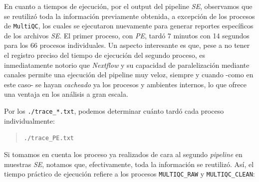 \documentclass[
  letterpaper,
  DIV=11,
  numbers=noendperiod]{scrartcl}
\begin{document}
En cuanto a tiempos de ejecución, por el output del pipeline \emph{SE},
observamos que se reutilizó toda la información previamente obtenida, a
excepción de los procesos de \texttt{MultiQC}, los cuales se ejecutaron
nuevamente para generar reportes específicos de los archivos \emph{SE}.
El primer proceso, con \emph{PE}, tardó 7 minutos con 14 segundos para
los 66 procesos individuales. Un aspecto interesante es que, pese a no
tener el registro preciso del tiempo de ejecución del segundo proceso,
es inmediatamente notorio que \emph{Nextflow} y su capacidad de
paralelización mediante canales permite una ejecución del pipeline muy
veloz, siempre y cuando -como en este caso- se hayan \emph{cacheado} ya
los procesos y ambientes internos, lo que ofrece una ventaja en los
análisis a gran escala.

Por los \texttt{./trace\_*.txt}, podemos determinar cuánto tardó cada
proceso individualmente:

\begin{quote}
\texttt{./trace\_PE.txt}
\end{quote}

Si tomamos en cuenta los proceso ya realizados de cara al segundo
\emph{pipeline} en muestras \emph{SE}, notamos que, efectivamente, toda
la información se reutilizó. Así, el tiempo práctico de ejecución
refiere a los procesos \texttt{MULTIQC\_RAW} y \texttt{MULTIQC\_CLEAN}:
\end{document}
